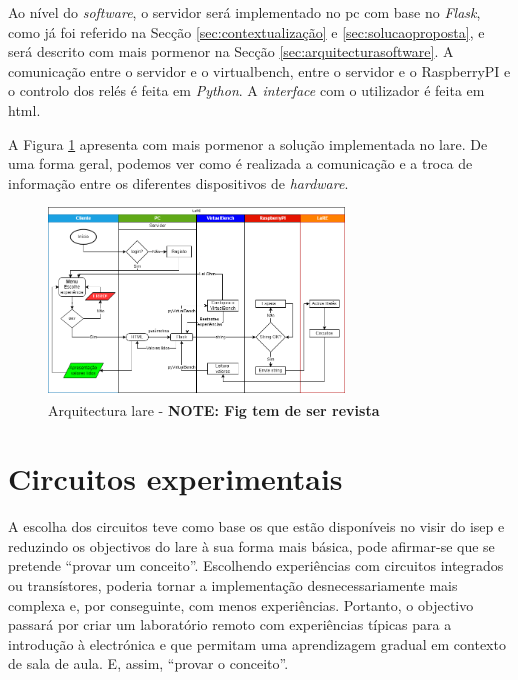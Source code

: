Ao nível do \textit{software}, o servidor será implementado no \acrshort{pc} com base no \textit{Flask}, como já foi referido na Secção \ref{sec:contextualização} e \ref{sec:solucaoproposta}, e será descrito com mais pormenor na Secção \ref{sec:arquitecturasoftware}. A comunicação entre o servidor e o \acrshort{virtualbench}, entre o servidor e o \gls{RaspberryPI} e o controlo dos relés é feita em \textit{Python}. A \textit{interface} com o utilizador é feita em \acrshort{html}.

A Figura {\ref{fig:arquitecturalore}} apresenta com mais pormenor a solução implementada no \acrshort{lare}. De uma forma geral, podemos ver como é realizada a comunicação e a troca de informação entre os diferentes dispositivos de \textit{hardware}.

\begin{figure}[hbtp]
    \centering
    \includegraphics[width=0.7\textwidth]{figures/Diagrama_SOFTWARE.drawio.png}
    \caption{Arquitectura \acrshort{lare} - \textbf{NOTE: Fig tem de ser revista}}
    \label{fig:arquitecturalore}
\end{figure}

\section{Circuitos experimentais}
\label{sec:circuitos}
A escolha dos circuitos teve como base os que estão disponíveis no \acrshort{visir} do \acrshort{isep} e reduzindo os objectivos do \acrshort{lare} à sua forma mais básica, pode afirmar-se que se pretende ``provar um conceito''. Escolhendo experiências com circuitos integrados ou transístores, poderia tornar a implementação desnecessariamente mais complexa e, por conseguinte, com menos experiências. Portanto, o objectivo passará por criar um \acrshort{laboratório remoto} com experiências típicas para a introdução à electrónica e que permitam uma aprendizagem gradual em contexto de sala de aula. E, assim, ``provar o conceito''.

